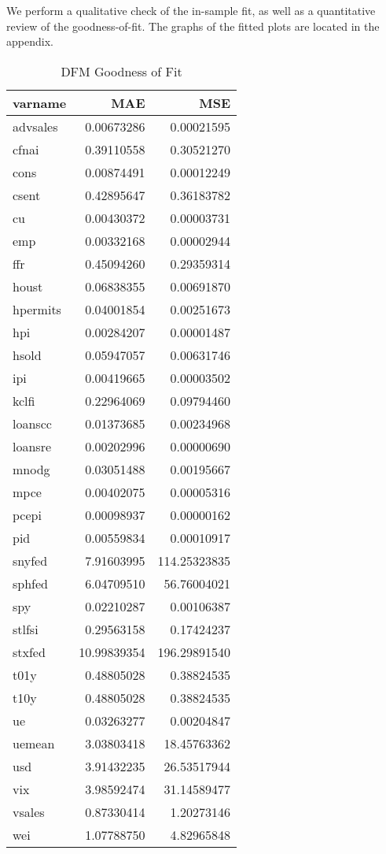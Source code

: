 \documentclass[11pt, letterpaper]{article}\usepackage[]{graphicx}\usepackage[]{color}
\begin{document}
We perform a qualitative check of the in-sample fit, as well as a quantitative review of the goodness-of-fit. The graphs of the fitted plots are located in the appendix.
\begin{table}[H]
\centering
\begingroup\footnotesize
\begin{tabular}{lrr}
  \hline
varname & MAE & MSE \\ 
  \hline
advsales & 0.00673286 & 0.00021595 \\ 
  cfnai & 0.39110558 & 0.30521270 \\ 
  cons & 0.00874491 & 0.00012249 \\ 
  csent & 0.42895647 & 0.36183782 \\ 
  cu & 0.00430372 & 0.00003731 \\ 
  emp & 0.00332168 & 0.00002944 \\ 
  ffr & 0.45094260 & 0.29359314 \\ 
  houst & 0.06838355 & 0.00691870 \\ 
  hpermits & 0.04001854 & 0.00251673 \\ 
  hpi & 0.00284207 & 0.00001487 \\ 
  hsold & 0.05947057 & 0.00631746 \\ 
  ipi & 0.00419665 & 0.00003502 \\ 
  kclfi & 0.22964069 & 0.09794460 \\ 
  loanscc & 0.01373685 & 0.00234968 \\ 
  loansre & 0.00202996 & 0.00000690 \\ 
  mnodg & 0.03051488 & 0.00195667 \\ 
  mpce & 0.00402075 & 0.00005316 \\ 
  pcepi & 0.00098937 & 0.00000162 \\ 
  pid & 0.00559834 & 0.00010917 \\ 
  snyfed & 7.91603995 & 114.25323835 \\ 
  sphfed & 6.04709510 & 56.76004021 \\ 
  spy & 0.02210287 & 0.00106387 \\ 
  stlfsi & 0.29563158 & 0.17424237 \\ 
  stxfed & 10.99839354 & 196.29891540 \\ 
  t01y & 0.48805028 & 0.38824535 \\ 
  t10y & 0.48805028 & 0.38824535 \\ 
  ue & 0.03263277 & 0.00204847 \\ 
  uemean & 3.03803418 & 18.45763362 \\ 
  usd & 3.91432235 & 26.53517944 \\ 
  vix & 3.98592474 & 31.14589477 \\ 
  vsales & 0.87330414 & 1.20273146 \\ 
  wei & 1.07788750 & 4.82965848 \\ 
   \hline
\end{tabular}
\endgroup
\caption{DFM Goodness of Fit} 
\end{table}
\end{document}
